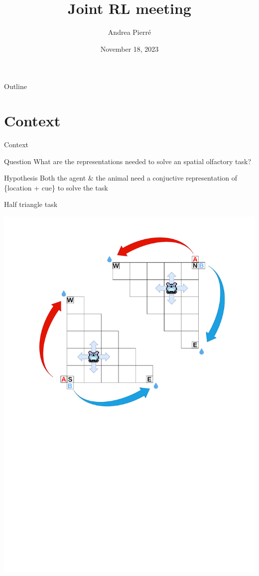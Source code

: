 \documentclass[bigger]{beamer}
\author{Andrea Pierré}
\date{November 18, 2023}
\title{Joint RL meeting}
\institute{Brown University}
\begin{document}
\maketitle
\begin{frame}[plain]{Outline}
\tableofcontents
\end{frame}

\section{Context}
\label{sec:orge7ed608}
\begin{frame}[label={sec:org00213a1}]{Context}
\begin{exampleblock}{Question}
    What are the representations needed to solve an spatial olfactory task?
\end{exampleblock}
\vspace{2em}
\begin{exampleblock}{Hypothesis}
    Both the agent \& the animal need a conjuctive representation of \{location + cue\} to solve the task
\end{exampleblock}
\end{frame}
\begin{frame}[label={sec:org3da6f7d}]{Half triangle task}
\begin{center}
\includegraphics[width=.9\linewidth]{img/RL_env-triangle-task.drawio.pdf}
\end{center}
\end{frame}
\end{document}
